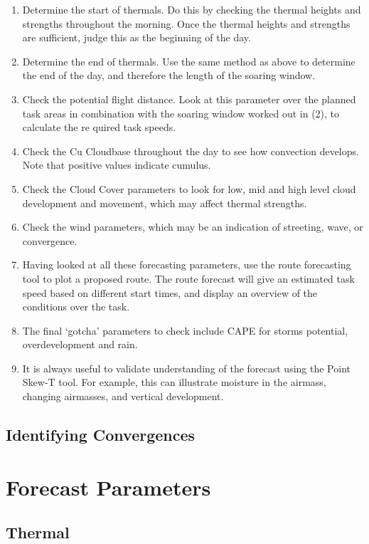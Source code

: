\documentclass[11pt,a4paper]{article}
\begin{document}
\begin{enumerate}
\item Determine the start of thermals. Do this by checking the thermal heights and strengths throughout the morning. Once the thermal heights and strengths are sufficient, judge this as the beginning of the day.
\item Determine the end of thermals. Use the same method as above to determine the end of the day, and therefore the length of the soaring window.
\item Check the potential flight distance. Look at this parameter over the planned task areas in combination with the soaring window worked out in (2), to calculate the re	quired task speeds.
\item Check the Cu Cloudbase throughout the day to see how convection develops. Note that positive values indicate cumulus.
\item Check the Cloud Cover  parameters to look for low, mid and high level cloud development and movement, which may affect thermal strengths.
\item Check the wind parameters, which may be an indication of streeting, wave, or convergence.
\item Having looked at all these forecasting parameters, use the route forecasting tool to plot a proposed route. The route forecast will give an estimated task speed based on different start times, and display an overview of the conditions over the task.
\item The final `gotcha' parameters to check include CAPE for storms potential, overdevelopment and rain.
\item It is always useful to validate understanding of the forecast using the Point Skew-T tool. For example, this can illustrate moisture in the airmass, changing airmasses, and vertical development.
\end{enumerate}

\subsection{Identifying Convergences}


\pagebreak
\appendix
\section{Forecast Parameters}

\subsection{Thermal}
\end{document}
